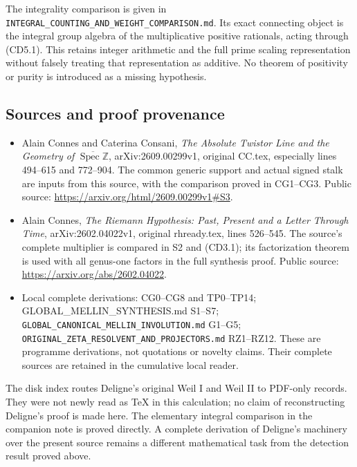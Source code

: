 \documentclass[
]{article}
\providecommand{\tightlist}{%
  \setlength{\itemsep}{0pt}\setlength{\parskip}{0pt}}
\begin{document}
The integrality comparison is given in
\nolinkurl{INTEGRAL_COUNTING_AND_WEIGHT_COMPARISON.md}. Its exact connecting
object is the integral group algebra of the multiplicative positive
rationals, acting through (CD5.1). This retains integer arithmetic and
the full prime scaling representation without falsely treating that
representation as additive. No theorem of positivity or purity is
introduced as a missing hypothesis.

\subsection{Sources and proof
provenance}\label{sources-and-proof-provenance}

\begin{itemize}
\tightlist
\item
  Alain Connes and Caterina Consani, \emph{The Absolute Twistor Line and
  the Geometry of} \(\overline{\operatorname{Spec}\mathbb Z}\),
  arXiv:2609.00299v1, original CC.tex, especially lines 494--615 and
  772--904. The common generic support and actual signed stalk are
  inputs from this source, with the comparison proved in CG1--CG3.
  Public source: \url{https://arxiv.org/html/2609.00299v1\#S3}.
\item
  Alain Connes, \emph{The Riemann Hypothesis: Past, Present and a Letter
  Through Time}, arXiv:2602.04022v1, original rhready.tex, lines
  526--545. The source's complete multiplier is compared in S2 and
  (CD3.1); its factorization theorem is used with all genus-one factors
  in the full synthesis proof. Public source:
  \url{https://arxiv.org/abs/2602.04022}.
\item
  Local complete derivations: CG0--CG8 and TP0--TP14;
  GLOBAL\_MELLIN\_SYNTHESIS.md S1--S7;
  \nolinkurl{GLOBAL_CANONICAL_MELLIN_INVOLUTION.md} G1--G5;
  \nolinkurl{ORIGINAL_ZETA_RESOLVENT_AND_PROJECTORS.md} RZ1--RZ12. These are
  programme derivations, not quotations or novelty claims. Their
  complete sources are retained in the cumulative local reader.
\end{itemize}

The disk index routes Deligne's original Weil I and Weil II to PDF-only
records. They were not newly read as TeX in this calculation; no claim
of reconstructing Deligne's proof is made here. The elementary integral
comparison in the companion note is proved directly. A complete
derivation of Deligne's machinery over the present source remains a
different mathematical task from the detection result proved above.
\end{document}
